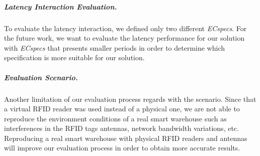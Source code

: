 \subparagraph{Latency Interaction Evaluation.}
\label{subp:latency_eval}
To evaluate the latency interaction, we defined only two different \textit{ECspecs}. For the future work,
we want to evaluate the latency performance for our solution with \textit{ECspecs} that presents smaller
periods in order to determine which specification is more suitable for our solution.

\subparagraph{Evaluation Scenario.}
\label{subp:scenario_eval}
Another limitation of our evaluation process regards with the scenario. Since that a virtual \gls{RFID}
reader was used instead of a physical one, we are not able to reproduce the environment conditions
of a real smart warehouse such as interferences in the \gls{RFID} tags antennas, network bandwidth
variations, etc. Reproducing a real smart warehouse with physical \gls{RFID} readers and antennas
will improve our evaluation process in order to obtain more accurate results.
